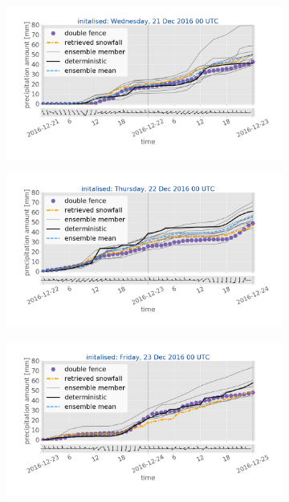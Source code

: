 \begin{figure}[t!]
	\centering
	\begin{subfigure}[t]{0.49\textwidth}		\includegraphics[trim={3.cm 2.6cm 2.cm 1.9cm},clip,width=\textwidth]{./fig_sfc_acc/acc_wind_20161221_00}
		\caption{}\label{fig:sfc_acc21}
	\end{subfigure}
	\begin{subfigure}[t]{0.49\textwidth}		\includegraphics[trim={3.cm 2.6cm 2.cm 1.9cm},clip,width=\textwidth]{./fig_sfc_acc/acc_wind_20161222_00}
		\caption{}\label{fig:sfc_acc22}
	\end{subfigure}
	\begin{subfigure}[t]{0.49\textwidth}	\includegraphics[trim={3.cm 2.6cm 2.cm 1.9cm},clip,width=\textwidth]{./fig_sfc_acc/acc_wind_20161223_00}

\end{subfigure}
\end{figure}
